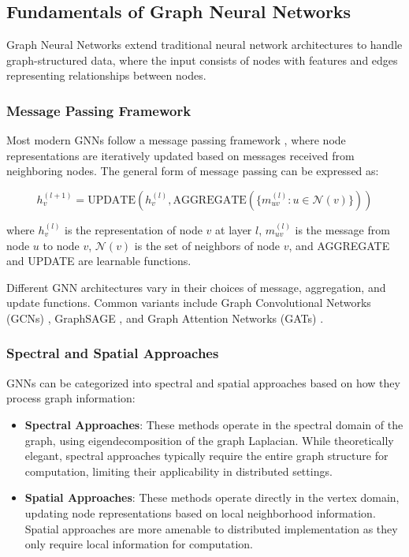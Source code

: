 \documentclass{article}
\begin{document}
\subsection{Fundamentals of Graph Neural Networks}

Graph Neural Networks extend traditional neural network architectures to handle graph-structured data, where the input consists of nodes with features and edges representing relationships between nodes.

\subsubsection{Message Passing Framework}

Most modern GNNs follow a message passing framework \cite{gilmer2017neural}, where node representations are iteratively updated based on messages received from neighboring nodes. The general form of message passing can be expressed as:

\begin{equation}
h_v^{(l+1)} = \text{UPDATE}\left(h_v^{(l)}, \text{AGGREGATE}\left(\{m_{uv}^{(l)} : u \in \mathcal{N}(v)\}\right)\right)
\end{equation}

where $h_v^{(l)}$ is the representation of node $v$ at layer $l$, $m_{uv}^{(l)}$ is the message from node $u$ to node $v$, $\mathcal{N}(v)$ is the set of neighbors of node $v$, and AGGREGATE and UPDATE are learnable functions.

Different GNN architectures vary in their choices of message, aggregation, and update functions. Common variants include Graph Convolutional Networks (GCNs) \cite{kipf2017semi}, GraphSAGE \cite{hamilton2017inductive}, and Graph Attention Networks (GATs) \cite{velivckovic2018graph}.

\subsubsection{Spectral and Spatial Approaches}

GNNs can be categorized into spectral and spatial approaches based on how they process graph information:

\begin{itemize}
    \item \textbf{Spectral Approaches}: These methods operate in the spectral domain of the graph, using eigendecomposition of the graph Laplacian. While theoretically elegant, spectral approaches typically require the entire graph structure for computation, limiting their applicability in distributed settings.
    
    \item \textbf{Spatial Approaches}: These methods operate directly in the vertex domain, updating node representations based on local neighborhood information. Spatial approaches are more amenable to distributed implementation as they only require local information for computation.
\end{itemize}
\end{document}
